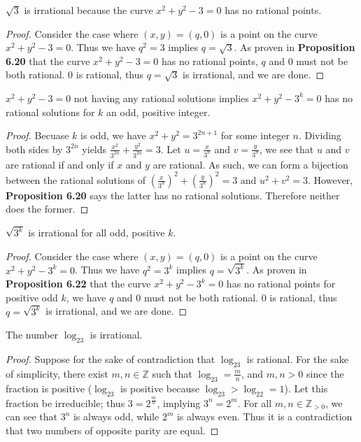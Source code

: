 \documentclass{exam}
\begin{document}
\begin{proposition}{6.21}
    $\sqrt3$ is irrational because the curve $x^2 + y^2 - 3 = 0$ has no rational points.
\end{proposition}

\begin{proof}
    Consider the case where $(x,y) = (q, 0)$ is a point on the curve $x^2+y^2-3 = 0$. Thus we have $q^2 = 3$ implies $q = \sqrt3$. As proven in \textbf{Proposition 6.20} that the curve $x^2+y^2-3 = 0$ has no rational points, $q$ and 0 must not be both rational. 0 is rational, thus $q = \sqrt3$ is irrational, and we are done.
\end{proof}

\begin{proposition}{6.22}
    $x^2+y^2-3=0$ not having any rational solutions implies $x^2 + y^2-3^k=0$ has no rational solutions for $k$ an odd, positive integer.
\end{proposition}

\begin{proof}
    Becuase $k$ is odd, we have $x^2 + y^2=3^{2n + 1}$ for some integer $n$. Dividing both sides by $3^{2n}$ yields $\frac{x^2}{3^{2n}}+\frac{y^2}{3^{2n}}=3$. Let $u = \frac{x}{3^n}$ and $v = \frac{y}{3^n}$, we see that $u$ and $v$ are rational if and only if $x$ and $y$ are rational. As such, we can form a bijection between the rational solutions of $\left(\frac{x}{3^n}\right)^2 + \left(\frac{y}{3^n}\right)^2 = 3$ and $u^2 + v^2 = 3$. However, \textbf{Proposition 6.20} says the latter has no rational solutions. Therefore neither does the former.
\end{proof}

\begin{proposition}{6.23}
    $\sqrt{3^k}$ is irrational for all odd, positive $k$.
\end{proposition}

\begin{proof}
    Consider the case where $(x,y) = (q, 0)$ is a point on the curve $x^2+y^2-3^k = 0$. Thus we have $q^2 = 3^k$ implies $q = \sqrt{3^k}$. As proven in \textbf{Proposition 6.22} that the curve $x^2+y^2-3^k = 0$ has no rational points for positive odd $k$, we have $q$ and 0 must not be both rational. 0 is rational, thus $q = \sqrt{3^k}$ is irrational, and we are done.
\end{proof}

\begin{proposition}{6.24}
    The number $\log_23$ is irrational.
\end{proposition}

\begin{proof}
    Suppose for the sake of contradiction that $\log_23$ is rational. For the sake of simplicity, there exist $m,n\in\mathbb Z$ such that $\log_23 = \frac m n$, and $m, n>0$ since the fraction is positive ($\log_23$ is positive because $\log_23>\log_22=1$). Let this fraction be irreducible; thus $3 = 2^{\frac m n}$, implying $3^n = 2^m$. For all $m, n\in\mathbb Z_{>0}$, we can see that $3^n$ is always odd, while $2^m$ is always even. Thus it is a contradiction that two numbers of opposite parity are equal.
\end{proof}
\end{document}
